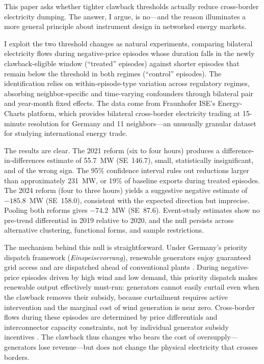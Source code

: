 \documentclass[12pt]{article}
\begin{document}
This paper asks whether tighter clawback thresholds actually reduce cross-border electricity dumping. The answer, I argue, is no---and the reason illuminates a more general principle about instrument design in networked energy markets.

I exploit the two threshold changes as natural experiments, comparing bilateral electricity flows during negative-price episodes whose duration falls in the newly clawback-eligible window (``treated'' episodes) against shorter episodes that remain below the threshold in both regimes (``control'' episodes). The identification relies on within-episode-type variation across regulatory regimes, absorbing neighbor-specific and time-varying confounders through bilateral pair and year-month fixed effects. The data come from Fraunhofer ISE's Energy-Charts platform, which provides bilateral cross-border electricity trading at 15-minute resolution for Germany and 11 neighbors---an unusually granular dataset for studying international energy trade.

The results are clear. The 2021 reform (six to four hours) produces a difference-in-differences estimate of 55.7~MW (SE~146.7), small, statistically insignificant, and of the wrong sign. The 95\% confidence interval rules out reductions larger than approximately 231~MW, or 19\% of baseline exports during treated episodes. The 2024 reform (four to three hours) yields a suggestive negative estimate of $-185.8$~MW (SE~158.0), consistent with the expected direction but imprecise. Pooling both reforms gives $-74.2$~MW (SE~87.6). Event-study estimates show no pre-trend differential in 2019 relative to 2020, and the null persists across alternative clustering, functional forms, and sample restrictions.

The mechanism behind this null is straightforward. Under Germany's priority dispatch framework (\textit{Einspeisevorrang}), renewable generators enjoy guaranteed grid access and are dispatched ahead of conventional plants \citep{sensfuss2008merit}. During negative-price episodes driven by high wind and low demand, this priority dispatch makes renewable output effectively must-run: generators cannot easily curtail even when the clawback removes their subsidy, because curtailment requires active intervention and the marginal cost of wind generation is near zero. Cross-border flows during these episodes are determined by price differentials and interconnector capacity constraints, not by individual generator subsidy incentives \citep{egerer2016electricity, keppler2016negative}. The clawback thus changes who bears the cost of oversupply---generators lose revenue---but does not change the physical electricity that crosses borders.
\end{document}
